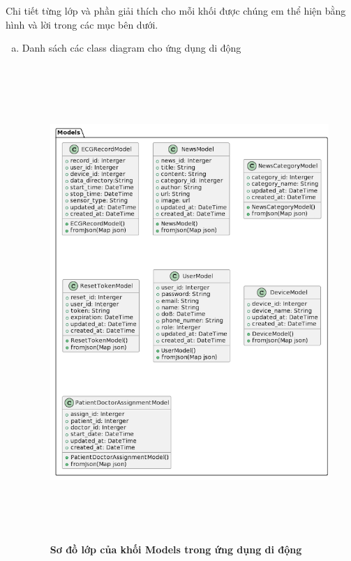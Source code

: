 Chi tiết từng lớp và phần giải thích cho mỗi khối được chúng em thể hiện bằng hình và lời trong các mục bên dưới. 

\begin{enumerate}[a)]
  \item Danh sách các class diagram cho ứng dụng di động
    
  \begin{figure}[H]
    \centering
    \includegraphics[width=16cm,height=18cm]{Images/mobile_app/class_diagram/mobile_class_model.png}
    \caption[Sơ đồ lớp của khối Models trong ứng dụng di động]{\bfseries \fontsize{12pt}{0pt}\selectfont Sơ đồ lớp của khối Models trong ứng dụng di động}
    \label{mobile_class_model} %
  \end{figure}


\end{enumerate}
